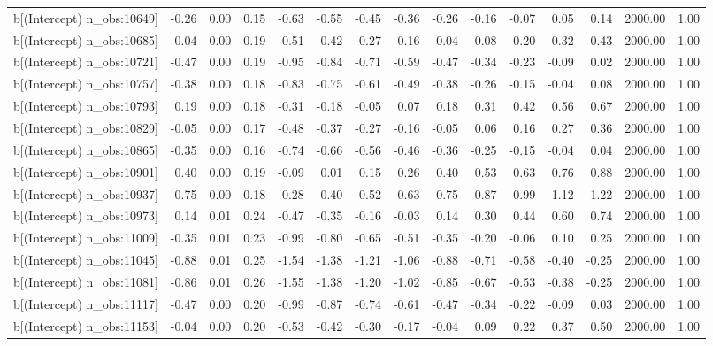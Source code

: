 \begin{table}[ht]
\begin{tabular}{rrrrrrrrrrrrrrr}
  b[(Intercept) n\_obs:10649] & -0.26 & 0.00 & 0.15 & -0.63 & -0.55 & -0.45 & -0.36 & -0.26 & -0.16 & -0.07 & 0.05 & 0.14 & 2000.00 & 1.00 \\ 
  b[(Intercept) n\_obs:10685] & -0.04 & 0.00 & 0.19 & -0.51 & -0.42 & -0.27 & -0.16 & -0.04 & 0.08 & 0.20 & 0.32 & 0.43 & 2000.00 & 1.00 \\ 
  b[(Intercept) n\_obs:10721] & -0.47 & 0.00 & 0.19 & -0.95 & -0.84 & -0.71 & -0.59 & -0.47 & -0.34 & -0.23 & -0.09 & 0.02 & 2000.00 & 1.00 \\ 
  b[(Intercept) n\_obs:10757] & -0.38 & 0.00 & 0.18 & -0.83 & -0.75 & -0.61 & -0.49 & -0.38 & -0.26 & -0.15 & -0.04 & 0.08 & 2000.00 & 1.00 \\ 
  b[(Intercept) n\_obs:10793] & 0.19 & 0.00 & 0.18 & -0.31 & -0.18 & -0.05 & 0.07 & 0.18 & 0.31 & 0.42 & 0.56 & 0.67 & 2000.00 & 1.00 \\ 
  b[(Intercept) n\_obs:10829] & -0.05 & 0.00 & 0.17 & -0.48 & -0.37 & -0.27 & -0.16 & -0.05 & 0.06 & 0.16 & 0.27 & 0.36 & 2000.00 & 1.00 \\ 
  b[(Intercept) n\_obs:10865] & -0.35 & 0.00 & 0.16 & -0.74 & -0.66 & -0.56 & -0.46 & -0.36 & -0.25 & -0.15 & -0.04 & 0.04 & 2000.00 & 1.00 \\ 
  b[(Intercept) n\_obs:10901] & 0.40 & 0.00 & 0.19 & -0.09 & 0.01 & 0.15 & 0.26 & 0.40 & 0.53 & 0.63 & 0.76 & 0.88 & 2000.00 & 1.00 \\ 
  b[(Intercept) n\_obs:10937] & 0.75 & 0.00 & 0.18 & 0.28 & 0.40 & 0.52 & 0.63 & 0.75 & 0.87 & 0.99 & 1.12 & 1.22 & 2000.00 & 1.00 \\ 
  b[(Intercept) n\_obs:10973] & 0.14 & 0.01 & 0.24 & -0.47 & -0.35 & -0.16 & -0.03 & 0.14 & 0.30 & 0.44 & 0.60 & 0.74 & 2000.00 & 1.00 \\ 
  b[(Intercept) n\_obs:11009] & -0.35 & 0.01 & 0.23 & -0.99 & -0.80 & -0.65 & -0.51 & -0.35 & -0.20 & -0.06 & 0.10 & 0.25 & 2000.00 & 1.00 \\ 
  b[(Intercept) n\_obs:11045] & -0.88 & 0.01 & 0.25 & -1.54 & -1.38 & -1.21 & -1.06 & -0.88 & -0.71 & -0.58 & -0.40 & -0.25 & 2000.00 & 1.00 \\ 
  b[(Intercept) n\_obs:11081] & -0.86 & 0.01 & 0.26 & -1.55 & -1.38 & -1.20 & -1.02 & -0.85 & -0.67 & -0.53 & -0.38 & -0.25 & 2000.00 & 1.00 \\ 
  b[(Intercept) n\_obs:11117] & -0.47 & 0.00 & 0.20 & -0.99 & -0.87 & -0.74 & -0.61 & -0.47 & -0.34 & -0.22 & -0.09 & 0.03 & 2000.00 & 1.00 \\ 
  b[(Intercept) n\_obs:11153] & -0.04 & 0.00 & 0.20 & -0.53 & -0.42 & -0.30 & -0.17 & -0.04 & 0.09 & 0.22 & 0.37 & 0.50 & 2000.00 & 1.00 \\ 

\end{tabular}
\end{table}
